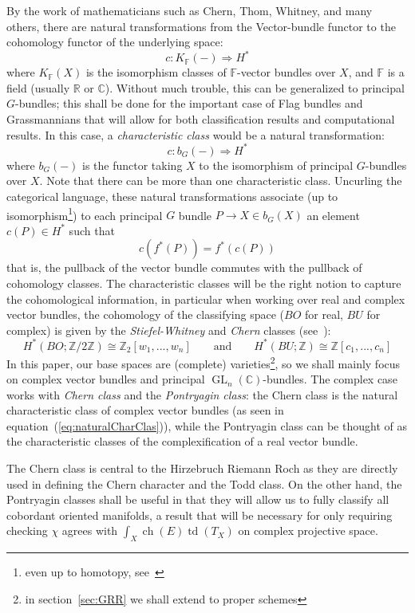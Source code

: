 \documentclass{ut-thesis}
\newcommand{\F}{{\mathbb{F}}}
\newcommand{\R}{{\mathbb{R}}}
\newcommand{\Z}{{\mathbb{Z}}}
\newcommand{\C}{{\mathbb{C}}}
\newcommand{\ch}{{\operatorname{ch}}}
\newcommand{\GL}{{\operatorname{GL}}}
\newcommand{\Rw}{\Rightarrow}
\newcommand{\td}{{\operatorname{td}}}
\renewcommand{\ch}{{\operatorname{ch}}}
\begin{document}
By the work of mathematicians such as Chern, Thom, Whitney, and many others, there are natural transformations
from the Vector-bundle functor to the cohomology functor of the underlying space:
\[
  c: K_\F(-) \Rw H^*
\]
where $K_\F(X)$ is the isomorphism classes of $\F$-vector bundles over $X$, and $\F$ is a field (usually $\R$
or $\C$). Without much trouble, this can be generalized to principal $G$-bundles; this shall be done for the
important case of Flag bundles and Grassmannians that will allow for both classification results and
computational results. In this case, a \emph{characteristic class} would be a natural transformation:
\[
  c: b_G(-) \Rw H^*
\]
where $b_G(-)$ is the functor taking $X$ to the isomorphism of principal $G$-bundles over $X$. Note that there
can be more than one characteristic class. Uncurling the categorical language, these natural
transformations associate (up to isomorphism\footnote{even up to homotopy, see~\cite{NateKTheory}}) to each principal $G$ bundle $P \to X\in b_G(X)$ an element $c(P) \in H^*$ such
that
\[
  c(f^*(P)) = f^*(c(P))
\]
that is, the pullback of the vector bundle commutes with the pullback of
cohomology classes. The characteristic classes will be the right notion to capture the cohomological
information, in particular when working over real and complex vector bundles, the cohomology
of the classifying space ($BO$ for real, $BU$ for complex) is given by the \emph{Stiefel-Whitney} and \emph{Chern} classes
(see~\cite{NateKTheory}):
\begin{equation}\label{eq:naturalCharClas}
  H^*(BO; \Z/2\Z) \cong \Z_2[w_1, ..., w_n] \qquad \text{and} \qquad  H^*(BU; \Z)
  \cong \Z[c_1, ..., c_n]
\end{equation}
In this paper, our base spaces are (complete) varieties\footnote{in section~\ref{sec:GRR} we shall extend to
proper schemes}, so we shall mainly focus on complex vector bundles and principal
$\GL_n(\C)$-bundles. The complex case works with \emph{Chern class} and the \emph{Pontryagin class}: the Chern class
is the natural characteristic class of complex vector bundles (as seen in
equation~(\ref{eq:naturalCharClas})), while the Pontryagin class can be thought of as the characteristic
classes of the complexification of a real vector bundle.

The Chern class is central to the Hirzebruch Riemann Roch as they are directly used in defining the Chern
character and the Todd class. On the other hand, the Pontryagin classes shall be useful in that they will
allow us to fully classify all cobordant oriented manifolds, a result that will be necessary for only requiring checking
$\chi$ agrees with $\int_X \ch(E)\td(T_X)$ on complex projective space.
\end{document}
